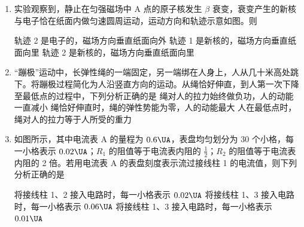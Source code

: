 \documentclass[\gkver]{gaokaozhenti}
\begin{document}
\begin{enumerate}
\item
实验观察到，静止在匀强磁场中 A 点的原子核发生 $\beta$ 衰变，衰变产生的新核与电子恰在纸面内做匀速圆周运动，运动方向和轨迹示意如图。则


{轨迹 2 是电子的，磁场方向垂直纸面向外}
{轨迹 1 是新核的，磁场方向垂直纸面向里}
{轨迹 2 是新核的，磁场方向垂直纸面向里}

\item
“蹦极”运动中，长弹性绳的一端固定，另一端绑在人身上，人从几十米高处跳下。将蹦极过程简化为人沿竖直方向的运动。从绳恰好伸直，到人第一次下降至最低点的过程中，下列分析正确的是
{绳对人的拉力始终做负功，人的动能一直减小}
{绳恰好伸直时，绳的弹性势能为零，人的动能最大}
{人在最低点时，绳对人的拉力等于人所受的重力}

\item
如图所示，其中电流表 A 的量程为 $0.6\UA$，表盘均匀划分为 30 个小格，每一小格表示 $0.02\UA$；$R_{1}$ 的阻值等于电流表内阻的 $\frac{1}{2}$；$R_{2}$ 的阻值等于电流表内阻的 2 倍。若用电流表 A 的表盘刻度表示流过接线柱 1 的电流值，则下列分析正确的是


{将接线柱 1、2 接入电路时，每一小格表示 $0.02\UA$}
{将接线柱 1、3 接入电路时，每一小格表示 $0.06\UA$}
{将接线柱 1、3 接入电路时，每一小格表示 $0.01\UA$}


\end{enumerate}
\end{document}
